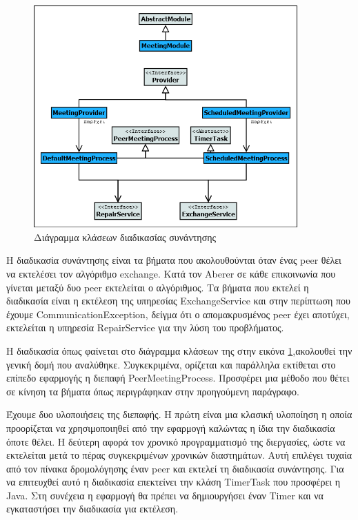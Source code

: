 \begin{figure}[htbp]
  \begin{center}
    \includegraphics[width=0.9\textwidth]{Figures/Architecture/Process_Layer/MeetingProcess_ClassDiagram.png}
  \end{center}
  \caption{Διάγραμμα κλάσεων διαδικασίας συνάντησης}
  \label{fig:MeetingProcess}
\end{figure}

Η διαδικασία συνάντησης είναι τα βήματα που ακολουθούνται όταν 
ένας peer θέλει να εκτελέσει τον αλγόριθμο exchange. Κατά τον Aberer 
\citep{Abererb} σε κάθε επικοινωνία που γίνεται μεταξύ δυο peer 
εκτελείται ο αλγόριθμος. Τα βήματα που εκτελεί η διαδικασία είναι η 
εκτέλεση της υπηρεσίας ExchangeService και στην περίπτωση που έχουμε 
CommunicationException, δείγμα ότι ο απομακρυσμένος peer έχει αποτύχει, 
εκτελείται η υπηρεσία RepairService για την λύση του προβλήματος.

Η διαδικασία όπως φαίνεται στο διάγραμμα κλάσεων της στην εικόνα 
\ref{fig:MeetingProcess},ακολουθεί την γενική δομή που αναλύθηκε. 
Συγκεκριμένα, ορίζεται και παράλληλα εκτίθεται στο επίπεδο εφαρμογής 
η διεπαφή PeerMeetingProcess. Προσφέρει μια μέθοδο που θέτει σε κίνηση τα βήματα 
όπως περιγράφηκαν στην προηγούμενη παράγραφο.

Έχουμε δυο υλοποιήσεις της διεπαφής. Η πρώτη είναι μια κλασική 
υλοποίηση η οποία προορίζεται να χρησιμοποιηθεί από την εφαρμογή 
καλώντας η ίδια την διαδικασία όποτε θέλει. Η δεύτερη αφορά τον χρονικό 
προγραμματισμό της διεργασίες, ώστε να εκτελείται μετά το πέρας 
συγκεκριμένων χρονικών διαστημάτων. Αυτή επιλέγει τυχαία από τον πίνακα 
δρομολόγησης έναν peer και εκτελεί τη διαδικασία συνάντησης. Για να 
επιτευχθεί αυτό η διαδικασία επεκτείνει την κλάση TimerTask που 
προσφέρει η Java. Στη συνέχεια η εφαρμογή θα πρέπει να δημιουργήσει έναν 
Timer και να εγκαταστήσει την διαδικασία για εκτέλεση.

